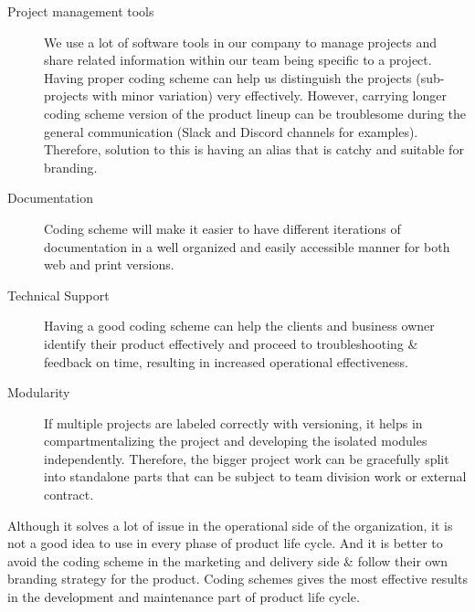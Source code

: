 \begin{description}
    \item[Project management tools] We use a lot of software tools in our company to manage projects and share related information within our team being specific to a project. Having proper coding scheme can help us distinguish the projects (sub-projects with minor variation) very effectively. However, carrying longer coding scheme version of the product lineup can be troublesome during the general communication (Slack and Discord channels for examples). Therefore, solution to this is having an alias that is catchy and suitable for branding.

    \item[Documentation] Coding scheme will make it easier to have different iterations of documentation in a well organized and easily accessible manner for both web and print versions.

    \item[Technical Support] Having a good coding scheme can help the clients and business owner identify their product effectively and proceed to troubleshooting \& feedback on time, resulting in increased operational effectiveness.

    \item[Modularity] If multiple projects are labeled correctly with versioning, it helps in compartmentalizing the project and developing the isolated modules independently. Therefore, the bigger project work can be gracefully split into standalone parts that can be subject to team division work or external contract.
\end{description}

Although it solves a lot of issue in the operational side of the organization, it is not a good idea to use in every phase of product life cycle. And it is better to avoid the coding scheme in the marketing and delivery side \& follow their own branding strategy for the product. Coding schemes gives the most effective results in the development and maintenance part of product life cycle.

\clearpage
